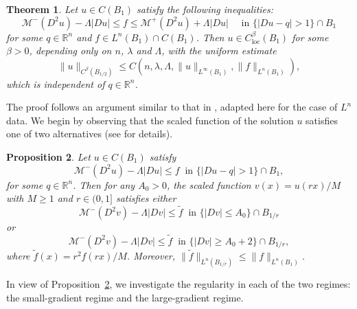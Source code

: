 \documentclass[11pt]{amsart}
\theoremstyle{plain}
\newtheorem{theorem}{Theorem}[section]
\newtheorem{proposition}[theorem]{Proposition}
\theoremstyle{definition}
\numberwithin{equation}{section}
\begin{document}
\begin{theorem} \label{holder}
    Let $u \in C(B_1)$ satisfy the following inequalities:
    \begin{equation*}
              \mathcal{M}^-(D^2u)-\Lambda|Du| \leq f \leq \mathcal{M}^+(D^2u)+\Lambda|Du| \quad \text{ in } \{|Du-q|>1\} \cap B_1 
    \end{equation*}
    for some $q \in \mathbb{R}^n$ and $f \in L^n(B_1) \cap C(B_1)$.
    Then $u\in C^{\beta}_{\mathrm{loc}}(B_{1})$ for some $\beta>0$, depending only on $n$, $\lambda$ and $\Lambda$, with the uniform estimate 
    \begin{equation*}
    \|u\|_{C^{\beta}(B_{1/2})} \leq C(n,\lambda,\Lambda,\|u\|_{L^\infty(B_1)}, \|f\|_{L^n(B_1)}),
    \end{equation*}
    which is independent of $q \in \mathbb{R}^n$.
\end{theorem}



The proof follows an argument similar to that in \cite{BKO252}, adapted here for the case of $L^n$ data. We begin by observing that the scaled function of the solution $u$ satisfies one of two alternatives (see \cite[Proposition~3.1]{BKO252} for details).

\begin{proposition} \label{twoprop}
    Let  $u\in C(B_1)$ satisfy
    \begin{equation*}
        \mathcal{M}^-(D^2u)-\Lambda|Du| \leq f \ \text{ in } \{|Du-q|> 1\} \cap B_1,
    \end{equation*}
    for some $q\in \mathbb{R}^n$.
    Then for any $A_0 >0$, the scaled function $v(x) = u(rx)/M$ with $M\geq 1$ and $r \in (0, 1]$ satisfies either
    \begin{equation*}
        \mathcal{M}^-(D^2v)-\Lambda|Dv| \leq \tilde{f} \ \text{ in } \{|Dv| \leq A_0\} \cap B_{1/r}
    \end{equation*}
    or
    \begin{equation*}
        \mathcal{M}^-(D^2v)-\Lambda|Dv| \leq \tilde{f}  \ \text{ in } \{|Dv| \geq A_0+2\} \cap B_{1/r},
    \end{equation*}
    where $\tilde{f}(x)=r^2f(rx)/M$. Moreover, $\|\tilde{f}\|_{L^n(B_{1/r})} \leq \|f\|_{L^n(B_1)}$.
\end{proposition}

In view of Proposition~\ref{twoprop}, we investigate the regularity in each of the two regimes: the small-gradient regime and the large-gradient regime.
\end{document}
